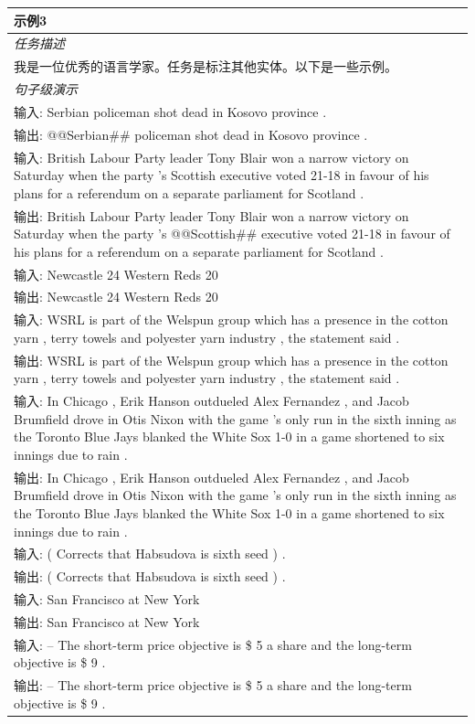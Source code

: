 \documentclass[supercite]{Experimental_Report}
\theoremstyle{definition}
\begin{document}
\begin{table}[th!]
{\begin{tabular}{l}
\textbf{示例3} \\\midrule
       	\textit{任务描述} \\
我是一位优秀的语言学家。任务是标注其他实体。以下是一些示例。 \\\midrule
\textit{句子级演示} \\
输入: Serbian policeman shot dead in Kosovo province . \\
输出: @@Serbian\#\# policeman shot dead in Kosovo province . \\
输入: British Labour Party leader Tony Blair won a narrow victory on Saturday when the party 's Scottish executive voted 21-18 in favour of his plans for a referendum on a separate parliament for Scotland . \\
输出: British Labour Party leader Tony Blair won a narrow victory on Saturday when the party 's @@Scottish\#\# executive voted 21-18 in favour of his plans for a referendum on a separate parliament for Scotland . \\
输入: Newcastle 24 Western Reds 20 \\
输出: Newcastle 24 Western Reds 20 \\
输入: WSRL is part of the Welspun group which has a presence in the cotton yarn , terry towels and polyester yarn industry , the statement said . \\
输出: WSRL is part of the Welspun group which has a presence in the cotton yarn , terry towels and polyester yarn industry , the statement said . \\
输入: In Chicago , Erik Hanson outdueled Alex Fernandez , and Jacob Brumfield drove in Otis Nixon with the game 's only run in the sixth inning as the Toronto Blue Jays blanked the White Sox 1-0 in a game shortened to six innings due to rain . \\
输出: In Chicago , Erik Hanson outdueled Alex Fernandez , and Jacob Brumfield drove in Otis Nixon with the game 's only run in the sixth inning as the Toronto Blue Jays blanked the White Sox 1-0 in a game shortened to six innings due to rain . \\
输入: ( Corrects that Habsudova is sixth seed ) . \\
输出: ( Corrects that Habsudova is sixth seed ) . \\
输入: San Francisco at New York \\
输出: San Francisco at New York \\
输入: -- The short-term price objective is \$ 5 a share and the long-term objective is \$ 9 . \\
输出: -- The short-term price objective is \$ 5 a share and the long-term objective is \$ 9 . \\\midrule

\end{tabular}}
\end{table}
\end{document}
